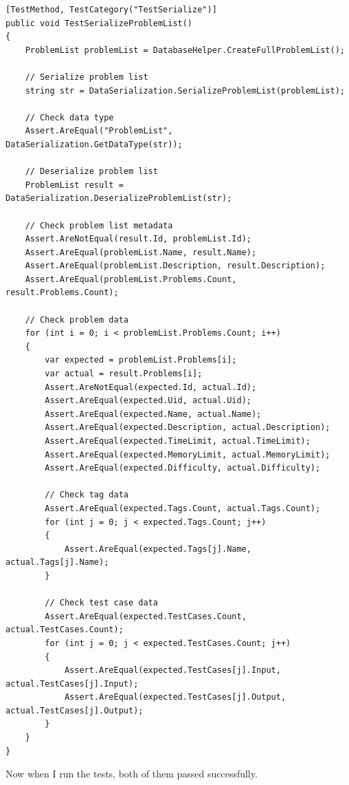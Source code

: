 \documentclass[a4paper]{report}
\begin{document}
\begin{verbatim}
[TestMethod, TestCategory("TestSerialize")]
public void TestSerializeProblemList()
{
    ProblemList problemList = DatabaseHelper.CreateFullProblemList();
    
    // Serialize problem list
    string str = DataSerialization.SerializeProblemList(problemList);
    
    // Check data type
    Assert.AreEqual("ProblemList", DataSerialization.GetDataType(str));

    // Deserialize problem list
    ProblemList result = DataSerialization.DeserializeProblemList(str);
    
    // Check problem list metadata
    Assert.AreNotEqual(result.Id, problemList.Id);
    Assert.AreEqual(problemList.Name, result.Name);
    Assert.AreEqual(problemList.Description, result.Description);
    Assert.AreEqual(problemList.Problems.Count, result.Problems.Count);
    
    // Check problem data
    for (int i = 0; i < problemList.Problems.Count; i++)
    {
        var expected = problemList.Problems[i];
        var actual = result.Problems[i];
        Assert.AreNotEqual(expected.Id, actual.Id);
        Assert.AreEqual(expected.Uid, actual.Uid);
        Assert.AreEqual(expected.Name, actual.Name);
        Assert.AreEqual(expected.Description, actual.Description);
        Assert.AreEqual(expected.TimeLimit, actual.TimeLimit);
        Assert.AreEqual(expected.MemoryLimit, actual.MemoryLimit);
        Assert.AreEqual(expected.Difficulty, actual.Difficulty);
        
        // Check tag data
        Assert.AreEqual(expected.Tags.Count, actual.Tags.Count);
        for (int j = 0; j < expected.Tags.Count; j++)
        {
            Assert.AreEqual(expected.Tags[j].Name, actual.Tags[j].Name);
        }

        // Check test case data
        Assert.AreEqual(expected.TestCases.Count, actual.TestCases.Count);
        for (int j = 0; j < expected.TestCases.Count; j++)
        {
            Assert.AreEqual(expected.TestCases[j].Input, actual.TestCases[j].Input);
            Assert.AreEqual(expected.TestCases[j].Output, actual.TestCases[j].Output);
        }
    }
}
\end{verbatim}

Now when I run the tests, both of them passed successfully.
\end{document}

